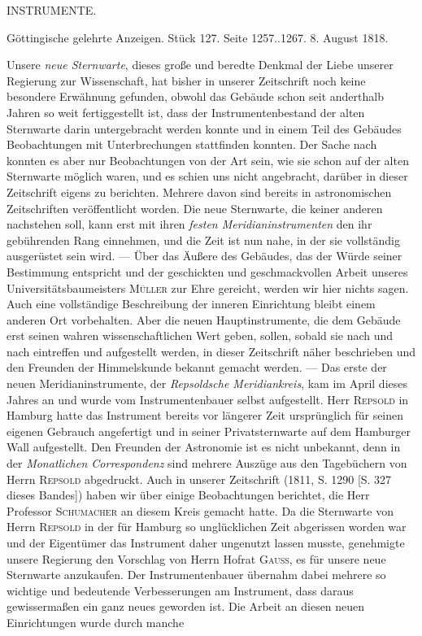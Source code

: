 \clearpage
{}
\begin{center}
\Large INSTRUMENTE.
\end{center}

\begin{center}
Göttingische gelehrte Anzeigen. Stück 127. Seite 1257..1267. 8. August 1818.
\end{center}

\par\indent Unsere \emph{neue Sternwarte}, dieses große und beredte Denkmal der Liebe unserer Regierung zur Wissenschaft, hat bisher in unserer Zeitschrift noch keine besondere Erwähnung gefunden, obwohl das Gebäude schon seit anderthalb Jahren so weit fertiggestellt ist, dass der Instrumentenbestand der alten Sternwarte darin untergebracht werden konnte und in einem Teil des Gebäudes Beobachtungen mit Unterbrechungen stattfinden konnten. Der Sache nach konnten es aber nur Beobachtungen von der Art sein, wie sie schon auf der alten Sternwarte möglich waren, und es schien uns nicht angebracht, darüber in dieser Zeitschrift eigens zu berichten. Mehrere davon sind bereits in astronomischen Zeitschriften veröffentlicht worden. Die neue Sternwarte, die keiner anderen nachstehen soll, kann erst mit ihren \emph{festen Meridianinstrumenten} den ihr gebührenden Rang einnehmen, und die Zeit ist nun nahe, in der sie vollständig ausgerüstet sein wird. --- Über das Äußere des Gebäudes, das der Würde seiner Bestimmung entspricht und der geschickten und geschmackvollen Arbeit unseres Universitätsbaumeisters \textsc{Müller} zur Ehre gereicht, werden wir hier nichts sagen. Auch eine vollständige Beschreibung der inneren Einrichtung bleibt einem anderen Ort vorbehalten. Aber die neuen Hauptinstrumente, die dem Gebäude erst seinen wahren wissenschaftlichen Wert geben, sollen, sobald sie nach und nach eintreffen und aufgestellt werden, in dieser Zeitschrift näher beschrieben und den Freunden der Himmelskunde bekannt gemacht werden. --- Das erste der neuen Meridianinstrumente, der \emph{Repsoldsche Meridiankreis}, kam im April dieses Jahres an und wurde vom Instrumentenbauer selbst aufgestellt. Herr \textsc{Repsold} in Hamburg hatte das Instrument bereits vor längerer Zeit ursprünglich für seinen eigenen Gebrauch angefertigt und in seiner Privatsternwarte auf dem Hamburger Wall aufgestellt. Den Freunden der Astronomie ist es nicht unbekannt, denn in der \textit{Monatlichen Correspondenz} sind mehrere Auszüge aus den Tagebüchern von Herrn \textsc{Repsold} abgedruckt. Auch in unserer Zeitschrift (1811, S. 1290 [S. 327 dieses Bandes]) haben wir über einige Beobachtungen berichtet, die Herr Professor \textsc{Schumacher} an diesem Kreis gemacht hatte. Da die Sternwarte von Herrn \textsc{Repsold} in der für Hamburg so unglücklichen Zeit abgerissen worden war und der Eigentümer das Instrument daher ungenutzt lassen musste, genehmigte unsere Regierung den Vorschlag von Herrn Hofrat \textsc{Gauss}, es für unsere neue Sternwarte anzukaufen. Der Instrumentenbauer übernahm dabei mehrere so wichtige und bedeutende Verbesserungen am Instrument, dass daraus gewissermaßen ein ganz neues geworden ist. Die Arbeit an diesen neuen Einrichtungen wurde durch manche 